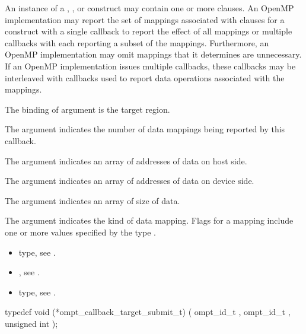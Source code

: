 \descr
An instance of a , , or  construct may contain one or more  clauses. 
An OpenMP implementation may report the set of mappings associated with  clauses for a construct 
with a single  callback to report the effect of all mappings or multiple 
 callbacks with each reporting a subset of the mappings. 
Furthermore, an OpenMP implementation may omit mappings that it determines are unnecessary.
If an OpenMP implementation issues multiple 
callbacks, these callbacks may be interleaved with  callbacks 
used to report data operations associated with the mappings. 

\argdesc

The binding of argument  is the target region.

The argument  indicates the number of data mappings being reported by this callback.

The argument  indicates an array of addresses of
data on host side.

The argument  indicates an array of addresses
of data on device side.

The argument  indicates an array of size of data.

The argument  indicates the kind of data
mapping. Flags for a mapping include one or more values specified by the type
.

\codeptrdesc


\crossreferences
\begin{itemize}
\item {} type, see
.
\item {}, 
see .
\item {} type, see
.
\end{itemize}


\label{sec:ompt_callback_target_submit_t}
\format

\begin{ccppspecific}
\begin{omptCallback}
typedef void (*ompt_callback_target_submit_t) (
  ompt_id_t ,
  ompt_id_t ,
  unsigned int 
);
\end{omptCallback}
\end{ccppspecific}


